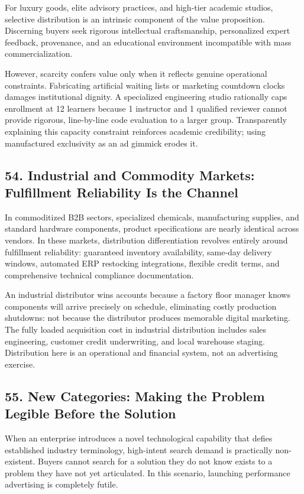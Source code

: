 For luxury goods, elite advisory practices, and high-tier academic studios, selective distribution is an intrinsic component of the value proposition. Discerning buyers seek rigorous intellectual craftsmanship, personalized expert feedback, provenance, and an educational environment incompatible with mass commercialization.

However, scarcity confers value only when it reflects genuine operational constraints. Fabricating artificial waiting lists or marketing countdown clocks damages institutional dignity. A specialized engineering studio rationally caps enrollment at 12 learners because 1 instructor and 1 qualified reviewer cannot provide rigorous, line-by-line code evaluation to a larger group. Transparently explaining this capacity constraint reinforces academic credibility; using manufactured exclusivity as an ad gimmick erodes it.

\subsection*{54. Industrial and Commodity Markets: Fulfillment Reliability Is the Channel}

In commoditized B2B sectors, specialized chemicals, manufacturing supplies, and standard hardware components, product specifications are nearly identical across vendors. In these markets, distribution differentiation revolves entirely around fulfillment reliability: guaranteed inventory availability, same-day delivery windows, automated ERP restocking integrations, flexible credit terms, and comprehensive technical compliance documentation.

An industrial distributor wins accounts because a factory floor manager knows components will arrive precisely on schedule, eliminating costly production shutdowns: not because the distributor produces memorable digital marketing. The fully loaded acquisition cost in industrial distribution includes sales engineering, customer credit underwriting, and local warehouse staging. Distribution here is an operational and financial system, not an advertising exercise.

\subsection*{55. New Categories: Making the Problem Legible Before the Solution}

When an enterprise introduces a novel technological capability that defies established industry terminology, high-intent search demand is practically non-existent. Buyers cannot search for a solution they do not know exists to a problem they have not yet articulated. In this scenario, launching performance advertising is completely futile.


